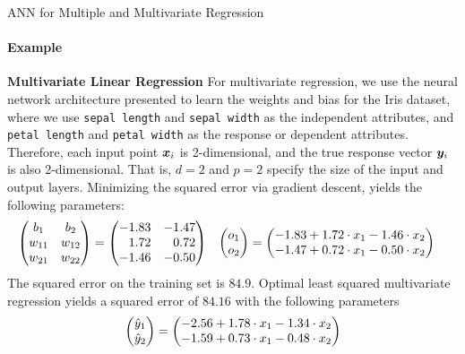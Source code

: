 \begin{frame}{ANN for Multiple and Multivariate Regression}
\framesubtitle{Example}

\textbf{Multivariate Linear Regression}
For multivariate regression, we use the neural network architecture 
presented
to learn the weights
and bias for the Iris dataset, where we use {\tt sepal
length} and {\tt sepal width} as the independent attributes, and {\tt
petal length} and {\tt petal width} as the response or dependent
attributes. Therefore, each input point ${\boldsymbol x}_i$ is 2-dimensional, and
the true response vector ${\boldsymbol y}_i$ is also 2-dimensional. That is, $d=2$
and $p=2$ specify the size of the input and output layers. Minimizing
the squared error via gradient descent, yields the following parameters:
\begin{align*}
    \matr{%
        b_1 & b_2\\
        w_{11} & w_{12}\\
        w_{21} & w_{22}
    } & = 
    \amatr{r}{
  -1.83 & -1.47\\
  1.72 &  0.72\\
  -1.46 & -0.50
  } &
    \matr{o_1 \\ o_2} & =
    \matr{
        -1.83 + 1.72 \cdot x_{1} - 1.46 \cdot x_2\\
        -1.47 + 0.72 \cdot x_{1} - 0.50 \cdot x_2
    }
\end{align*}
The squared error on the training set is $84.9$. Optimal least squared
multivariate regression yields a squared error of $84.16$ with the
following parameters
\begin{align*}
    \begin{pmatrix} \hat{y}_1 \\ \hat{y}_2 \end{pmatrix} =
    \begin{pmatrix} 
        -2.56 + 1.78 \cdot x_{1} - 1.34 \cdot x_2\\
        -1.59 + 0.73 \cdot x_{1} - 0.48 \cdot x_2
     \end{pmatrix}
\end{align*}
\end{frame}
%
%
%
